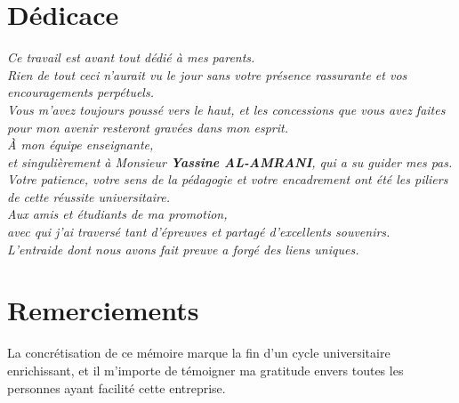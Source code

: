 \documentclass[final]{report}
\begin{document}
\chapter*{Dédicace}
\thispagestyle{fancy}
 
\vspace*{3cm}
 
\begin{center}
  \textit{\large Ce travail est avant tout dédié à mes parents.}\\[0.5cm]
  \textit{Rien de tout ceci n'aurait vu le jour sans votre présence rassurante et vos encouragements perpétuels.\\
  Vous m'avez toujours poussé vers le haut, et les concessions que vous avez faites pour mon avenir resteront gravées dans mon esprit.}\\[1cm]
 
  \textit{\large À mon équipe enseignante,}\\[0.5cm]
  \textit{et singulièrement à Monsieur \textbf{Yassine AL-AMRANI}, qui a su guider mes pas.\\
  Votre patience, votre sens de la pédagogie et votre encadrement ont été les piliers de cette réussite universitaire.}\\[1cm]
 
  \textit{\large Aux amis et étudiants de ma promotion,}\\[0.5cm]
  \textit{avec qui j'ai traversé tant d'épreuves et partagé d'excellents souvenirs.\\
  L'entraide dont nous avons fait preuve a forgé des liens uniques.}\\[1.5cm]
\end{center}
 
\newpage
 
\chapter*{Remerciements}
\thispagestyle{fancy}
 
La concrétisation de ce mémoire marque la fin d'un cycle universitaire enrichissant, et il m'importe de témoigner ma gratitude envers toutes les personnes ayant facilité cette entreprise.
 
\end{document}
